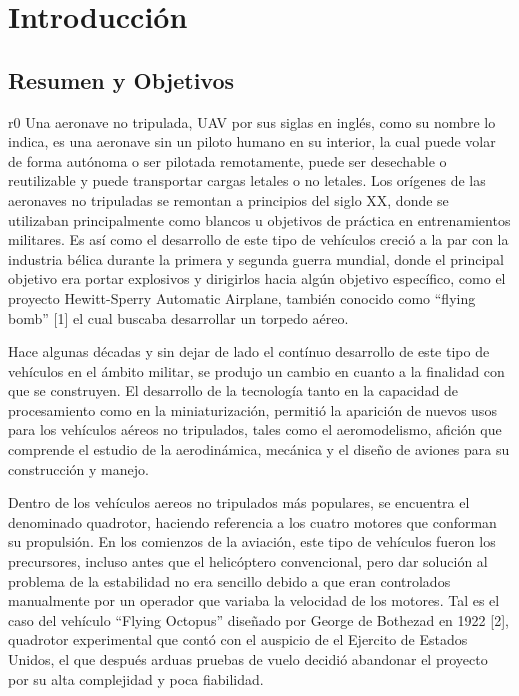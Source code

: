 \documentclass[../main.tex]{subfiles}
\begin{document}
		
	\chapter[Introducción]{Introducción}
	\section[Resumen]{Resumen y Objetivos}	

\gls{r0}
Una aeronave no tripulada, UAV por sus siglas en inglés, como su nombre lo indica,
es una aeronave sin un piloto humano en su interior,
la cual puede volar de forma autónoma o ser pilotada remotamente,
puede ser desechable o reutilizable y puede transportar cargas letales
o no letales. Los orígenes de las aeronaves no tripuladas se remontan
a principios del siglo XX, donde se utilizaban principalmente como
blancos u objetivos de práctica en entrenamientos militares. Es así
como el desarrollo de este tipo de vehículos creció a la par con la
industria bélica durante la primera y segunda guerra mundial, donde
el principal objetivo era portar explosivos y dirigirlos hacia algún
objetivo específico, como el proyecto Hewitt-Sperry Automatic Airplane,
también conocido como ``flying bomb'' {[}1{]} el cual buscaba desarrollar
un torpedo aéreo.

\textcompwordmark{}

Hace algunas décadas y sin dejar de lado el contínuo desarrollo de
este tipo de vehículos en el ámbito militar, se produjo un cambio
en cuanto a la finalidad con que se construyen. El desarrollo de la
tecnología tanto en la capacidad de procesamiento como en la miniaturización,
permitió la aparición de nuevos usos para los vehículos aéreos no
tripulados, tales como el aeromodelismo, afición que comprende el
estudio de la aerodinámica, mecánica y el diseño de aviones para su construcción
y manejo. 

\textcompwordmark{}

Dentro de los vehículos aereos no tripulados más populares, se encuentra
el denominado quadrotor, haciendo referencia a los cuatro motores
que conforman su propulsión. En los comienzos de la aviación, este
tipo de vehículos fueron los precursores, incluso antes que el helicóptero
convencional, pero dar solución al problema de la estabilidad no era
sencillo debido a que eran controlados manualmente por un operador
que variaba la velocidad de los motores. Tal es el caso del vehículo
``Flying Octopus'' diseñado por George de Bothezad en 1922 {[}2{]},
quadrotor experimental que contó con el auspicio de el Ejercito de
Estados Unidos, el que después arduas pruebas de vuelo decidió abandonar
el proyecto por su alta complejidad y poca fiabilidad.
\end{document}
